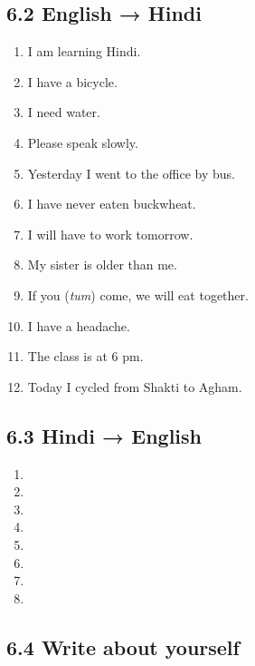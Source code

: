 \subsection{6.2 English → Hindi}

\begin{enumerate}
  \item I am learning Hindi.
  \item I have a bicycle.
  \item I need water.
  \item Please speak slowly.
  \item Yesterday I went to the office by bus.
  \item I have never eaten buckwheat.
  \item I will have to work tomorrow.
  \item My sister is older than me.
  \item If you (\textit{tum}) come, we will eat together.
  \item I have a headache.
  \item The class is at 6 pm.
  \item Today I cycled from Shakti to Agham.
\end{enumerate}

\subsection{6.3 Hindi → English}

\begin{enumerate}
  \item {}
  \item {}
  \item {}
  \item {}
  \item {}
  \item {}
  \item {}
  \item {}
\end{enumerate}

\subsection{6.4 Write about yourself}

